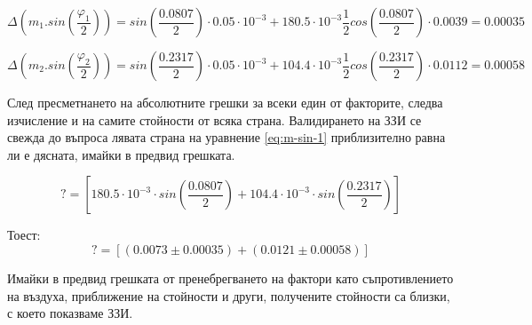 \documentclass[12pt]{article}
\begin{document}
\begin{displaymath}
    \Delta (m_1.sin(\frac{\varphi_1}{2})) = 
    sin(\frac{0.0807}{2})\cdot 0.05 \cdot 10^{-3} + 180.5 \cdot 10^{-3}\frac{1}{2}cos(\frac{0.0807}{2})\cdot 0.0039 = 0.00035
\end{displaymath}

\begin{displaymath}
    \Delta (m_2.sin(\frac{\varphi_2}{2})) = 
    sin(\frac{0.2317}{2})\cdot 0.05 \cdot 10^{-3} + 104.4 \cdot 10^{-3}\frac{1}{2}cos(\frac{0.2317}{2})\cdot 0.0112 = 0.00058
\end{displaymath}


След пресметнането на абсолютните грешки за всеки един от факторите, следва изчисление и на самите стойности от всяка страна. Валидирането на ЗЗИ се свежда до въпроса лявата страна на уравнение \ref{eq:m-sin-1} приблизително равна ли е дясната, имайки в предвид грешката.

\begin{displaymath}
    [180.5 \cdot 10^{-3}\cdot sin(\frac{0.24}{2})] ?= [180.5 \cdot 10^{-3}\cdot sin(\frac{0.0807}{2}) + 104.4 \cdot 10^{-3}\cdot sin(\frac{0.2317}{2})]
\end{displaymath}

Тоест:
\begin{displaymath}
    [(0.0216  \pm 0.00093)] ?= [(0.0073 \pm 0.00035) + (0.0121 \pm 0.00058)]
\end{displaymath}

Имайки в предвид грешката от пренебрегването на фактори като съпротивлението на въздуха, приближение на стойности и други, получените стойности са близки, с което показваме ЗЗИ.
\end{document}
